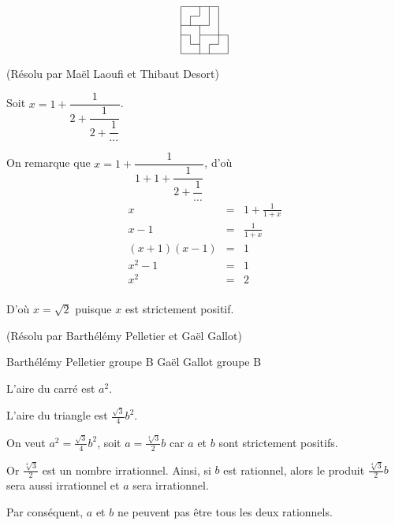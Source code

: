 \begin{sol}[34]
\[\begin{tikzpicture}[scale=0.3]
\draw (0, 0)--(0,5 );
\draw (1, 1)--(1,2 );
\draw (1, 3)--(1,4 );
\draw (2, 0)--(2,3 );
\draw (2, 4)--(2,5 );
\draw (3, 0)--(3,1 );
\draw (3, 3)--(3,5 );
\draw (4, 1)--(4,5 );
\draw (5, 0)--(5,2 );

\draw(0,0)--(5,0);
\draw(1,1)--(2,1);
\draw(3,1)--(4,1);
\draw(0,2)--(1,2);
\draw(2,2)--(5,2);
\draw(0,3)--(3,3);
\draw(1,4)--(2,4);
\draw(0,5)--(4,5);
\end{tikzpicture}\]

\end{sol}

\begin{sol}[42](Résolu par Maël Laoufi et Thibaut Desort)

Soit $x=1+\dfrac{1}{2+\dfrac{1}{2+\dfrac{1}{\cdots}}}$.

On remarque que $x=1+\dfrac{1}{1+1+\dfrac{1}{2+\dfrac{1}{\cdots}}}$, 
d'où 
\begin{eqnarray*}
x &=& 1+\frac{1}{1+x} \\
x-1 &=& \frac{1}{1+x}\\
(x+1)(x-1) &=& 1\\
x^2-1 &=& 1\\
x^2 &=& 2\\
\end{eqnarray*}

D'où $x=\sqrt{2}$ puisque $x$ est strictement positif.


\end{sol}


\begin{sol}[56](Résolu par Barthélémy Pelletier et Gaël Gallot)

Barthélémy Pelletier groupe B
Gaël Gallot groupe B

L'aire du carré est $a^2$.

L'aire du triangle est $\frac{\sqrt{3}}{4}b^2$.

On veut $a^2=\frac{\sqrt{3}}{4}b^2$, soit $a=\frac{\sqrt[4]{3}}{2}b$ car $a$ et $b$ sont strictement positifs.

Or $\frac{\sqrt[4]{3}}{2}$ est un nombre irrationnel.
Ainsi, si $b$ est rationnel, alors le produit $\frac{\sqrt[4]{3}}{2}b$ sera aussi irrationnel et $a$ sera irrationnel.

Par conséquent, $a$ et $b$ ne peuvent pas être tous les deux rationnels.

\end{sol}


